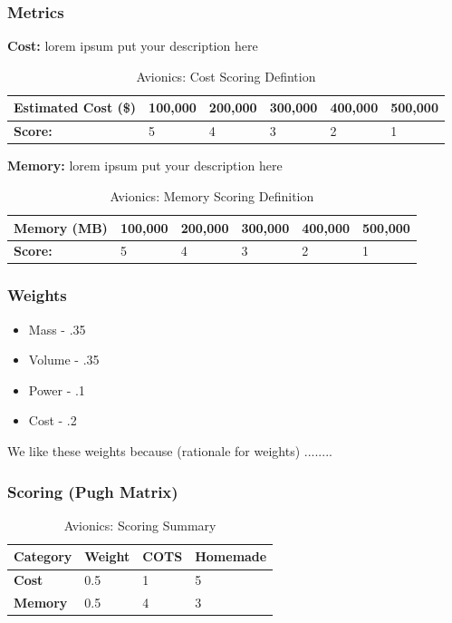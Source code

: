 \documentclass[3p]{elsarticle}
\begin{document}
\subsubsection{Metrics}
\textbf{Cost:} lorem ipsum put your description here
\begin{table}[H]
\centering
\begin{tabular}{|l|l|l|l|l|l|} 
\hline
    \textbf{Estimated Cost (\$) } & 100,000 & 200,000 & 300,000 & 400,000 & 500,000
    \\
\hline
    \textbf{Score:} & 5 & 4 & 3 & 2 & 1
    \\
\hline
\end{tabular}
\caption{Avionics: Cost Scoring Defintion \cite{einstein}}
\label{tbl:avioniccost}
\end{table}

\textbf{Memory:} lorem ipsum put your description here
\begin{table}[H]
\centering
\begin{tabular}{|l|l|l|l|l|l|} 
\hline
    \textbf{Memory (MB) } & 100,000 & 200,000 & 300,000 & 400,000 & 500,000
    \\
\hline
    \textbf{Score:} & 5 & 4 & 3 & 2 & 1
    \\
\hline
\end{tabular}
\caption{Avionics: Memory Scoring Definition \cite{einstein}}
\label{tbl:avionicsmemory}
\end{table}

\subsubsection{Weights}

\begin{itemize}
    \item Mass - .35
    \item Volume - .35
    \item Power - .1
    \item Cost - .2
\end{itemize}

We like these weights because (rationale for weights) ........ 

\subsubsection{Scoring (Pugh Matrix)}

\begin{table}[H]
\centering
\begin{tabular}{|l|l|l|l|} 
\hline
    \textbf{Category} & \textbf{Weight} & \textbf{COTS} & \textbf{Homemade}
    \\
\hline
    \textbf{Cost} & 0.5 & 1 & 5
    \\
\hline
    \textbf{Memory} & 0.5 & 4 & 3
    \\
\hline
\end{tabular}
\caption{Avionics: Scoring Summary \cite{einstein}}
\label{tbl:avionicsscoresy}
\end{table}
\end{document}
